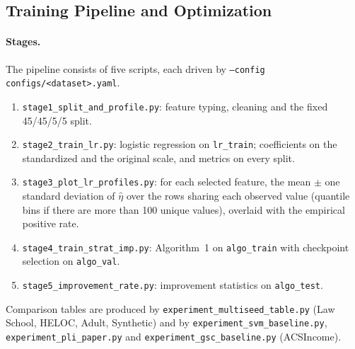 \subsection{Training Pipeline and Optimization}
\label{app:training}

\paragraph{Stages.} The pipeline consists of five scripts, each driven by
\texttt{--config configs/<dataset>.yaml}.
\begin{enumerate}
  \item \texttt{stage1\_split\_and\_profile.py}: feature typing, cleaning and
        the fixed 45/45/5/5 split.
  \item \texttt{stage2\_train\_lr.py}: logistic regression on
        \texttt{lr\_train}; coefficients on the standardized and the original
        scale, and metrics on every split.
  \item \texttt{stage3\_plot\_lr\_profiles.py}: for each selected feature, the
        mean $\pm$ one standard deviation of $\widehat{\eta}$ over the rows
        sharing each observed value (quantile bins if there are more than 100
        unique values), overlaid with the empirical positive rate.
  \item \texttt{stage4\_train\_strat\_imp.py}: Algorithm~1 on
        \texttt{algo\_train} with checkpoint selection on \texttt{algo\_val}.
  \item \texttt{stage5\_improvement\_rate.py}: improvement statistics on
        \texttt{algo\_test}.
\end{enumerate}
Comparison tables are produced by \texttt{experiment\_multiseed\_table.py}
(Law School, HELOC, Adult, Synthetic) and by \texttt{experiment\_svm\_baseline.py},
\texttt{experiment\_pli\_paper.py} and \texttt{experiment\_gsc\_baseline.py}
(ACSIncome).

